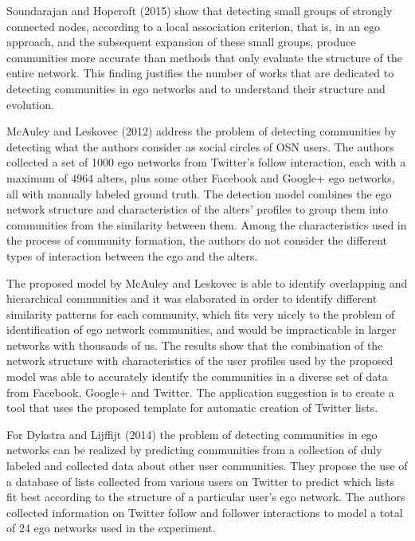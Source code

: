 Soundarajan and Hopcroft (2015) \cite{Soundarajan2015} show that detecting small groups of strongly connected nodes, according to a local association criterion, that is, in an ego approach, and the subsequent expansion of these small groups, produce communities more accurate than methods that only evaluate the structure of the entire network. This finding justifies the number of works that are dedicated to detecting communities in ego networks and to understand their structure and evolution.

McAuley and Leskovec (2012) \cite{McAuley:2012,Leskovec2012} address the problem of detecting communities by detecting what the authors consider as social circles of OSN users. The authors collected a set of 1000 ego networks from Twitter's follow interaction, each with a maximum of 4964 alters, plus some other Facebook and Google+ ego networks, all with manually labeled ground truth. The detection model combines the ego network structure and characteristics of the alters' profiles to group them into communities from the similarity between them. Among the characteristics used in the process of community formation, the authors do not consider the different types of interaction between the ego and the alters. 

The proposed model by McAuley and Leskovec is able to identify overlapping and hierarchical communities and it was elaborated in order to identify different similarity patterns for each community, which fits very nicely to the problem of identification of ego network communities, and would be impracticable in larger networks with thousands of us. The results show that the combination of the network structure with characteristics of the user profiles used by the proposed model was able to accurately identify the communities in a diverse set of data from Facebook, Google+ and Twitter. The application suggestion is to create a tool that uses the proposed template for automatic creation of Twitter lists.

For Dykstra and Lijffijt (2014) \cite{Dykstra2014} the problem of detecting communities in ego networks can be realized by predicting communities from a collection of duly labeled and collected data about other user communities. They propose the use of a database of lists collected from various users on Twitter to predict which lists fit best according to the structure of a particular user's ego network. The authors collected information on Twitter follow and follower interactions to model a total of 24 ego networks used in the experiment.

